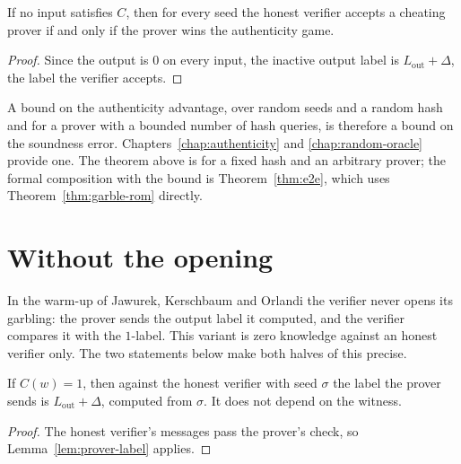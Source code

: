 \begin{theorem}
  \label{thm:sound}
  \leanok
  If no input satisfies $C$, then for every seed the honest verifier accepts a cheating prover if
  and only if the prover wins the authenticity game.
\end{theorem}

\begin{proof}
  \leanok
  Since the output is $0$ on every input, the inactive output label is
  $L_{\mathrm{out}} + \Delta$, the label the verifier accepts.
\end{proof}

A bound on the authenticity advantage, over random seeds and a random hash and for a prover with a
bounded number of hash queries, is therefore a bound on the soundness error.
Chapters~\ref{chap:authenticity} and \ref{chap:random-oracle} provide one. The theorem above is for
a fixed hash and an arbitrary prover; the formal composition with the bound is
Theorem~\ref{thm:e2e}, which uses Theorem~\ref{thm:garble-rom} directly.

\section{Without the opening}
\label{sec:no-opening}

In the warm-up of Jawurek, Kerschbaum and Orlandi \cite[Sect.~3]{JKO13} the verifier never opens
its garbling: the prover sends the output label it computed, and the verifier compares it with the
$1$-label. This variant is zero knowledge against an honest verifier only. The two statements below
make both halves of this precise.

\begin{theorem}
  \label{thm:hvzk}
  \leanok
  If $C(w) = 1$, then against the honest verifier with seed $\sigma$ the label the prover sends is
  $L_{\mathrm{out}} + \Delta$, computed from $\sigma$. It does not depend on the witness.
\end{theorem}

\begin{proof}
  \leanok
  The honest verifier's messages pass the prover's check, so Lemma~\ref{lem:prover-label} applies.
\end{proof}

